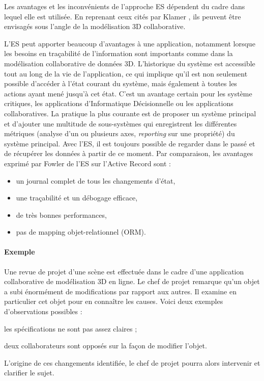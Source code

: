 Les avantages et les inconvénients de l'approche \gls{ES} dépendent du
cadre dans lequel elle est utilisée. En reprenant ceux cités par Klamer 
\cite{Klamer2013a}, ils peuvent être envisagés sous l'angle de la modélisation 
\gls{3D} 
collaborative.

L'\gls{ES} peut apporter beaucoup d'avantages à une application, notamment 
lorsque les besoins en traçabilité de l'information sont importants comme dans 
la modélisation collaborative de données \gls{3D}.
L'historique du système est accessible tout au long de la vie de l'application, ce 
qui implique qu'il est non seulement possible d'accéder à l'état courant du 
système, mais également à toutes les actions ayant mené jusqu'à cet état. C'est 
un avantage certain pour les système critiques, les applications d'Informatique 
Décisionnelle ou les applications collaboratives. La pratique la plus 
courante est de proposer un système principal et d'ajouter une multitude de 
sous-systèmes qui enregistrent les différentes métriques (analyse d'un ou 
plusieurs axes, \textit{reporting} sur une propriété) du système principal. Avec 
l'\gls{ES}, il est toujours possible de regarder \og dans le passé\fg{} et de 
récupérer les données à partir de ce moment. Par comparaison, les avantages 
exprimé par Fowler \cite{Fowler2003} de l'\gls{ES} sur l'Active Record sont :
\begin{itemize}
	\item un journal complet de tous les changements d'état,
	\item une traçabilité et un débogage efficace,
	\item de très bonnes performances,
	\item pas de mapping objet-relationnel (ORM).
\end{itemize}

	
\paragraph{Exemple} 
Une revue de projet d'une scène est effectuée dans le cadre d'une application 
collaborative de modélisation \gls{3D} en ligne. Le chef de projet remarque qu'un 
objet a subi énormément de modifications par rapport aux autres. Il examine en 
particulier cet objet pour en connaître les causes. Voici deux exemples 
d'observations possibles : 
\begin{enumerate*}[label=(\roman*)]
	\item les spécifications ne sont pas assez claires ;
	\item deux collaborateurs sont opposés sur la façon de modifier l'objet.
\end{enumerate*}
L'origine de ces changements identifiée, le chef de projet pourra alors intervenir 
et clarifier le sujet. 

